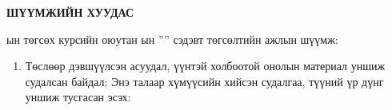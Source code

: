\begin{titlepage}
\begin{center}

{\scshape\Large \univname\par} %
{\scshape\large \facname\par}\vspace{1cm} %

\textbf{{\Large ШҮҮМЖИЙН ХУУДАС}}\\[1cm]

\end{center}

\normalsize

\deptname ын төгсөх курсийн оюутан \shortname ын ''\ttitle'' сэдэвт төгсөлтийн ажлын шүүмж:

\begin{enumerate}
\item Төслөөр дэвшүүлсэн асуудал, үүнтэй холбоотой онолын материал уншиж судалсан байдал; Энэ талаар хүмүүсийн хийсэн судалгаа, түүний үр дүнг уншиж тусгасан эсэх:
\begin{center}
\dotfill \\[0.1cm]
\dotfill \\[0.1cm]
\dotfill \\[0.1cm]
\dotfill \\[0.1cm]
\dotfill \\[0.1cm]
\dotfill \\[0.1cm]


\end{center}
\end{enumerate}
\end{titlepage}
